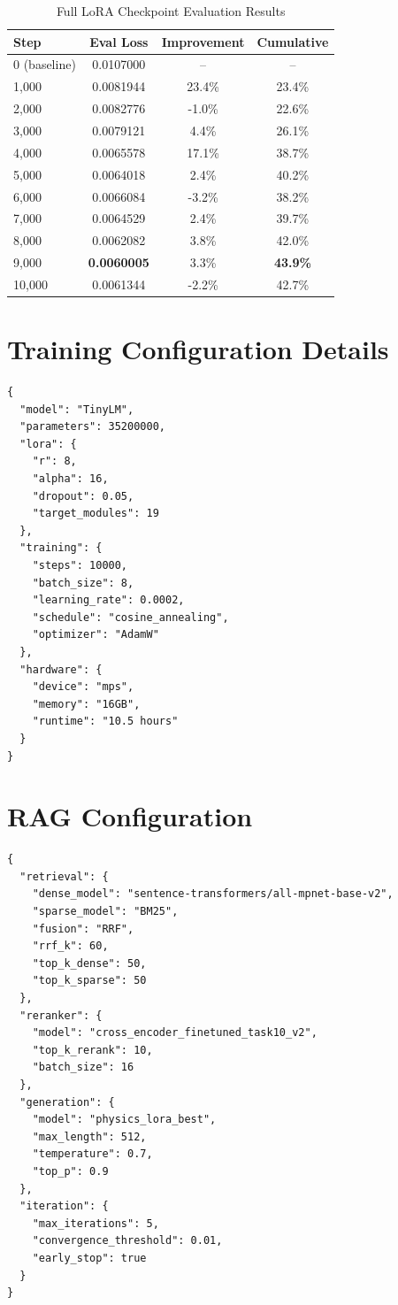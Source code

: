 \documentclass[11pt,a4paper]{article}
\theoremstyle{plain}
\theoremstyle{definition}
\begin{document}
\begin{table}[H]
\centering
\caption{Full LoRA Checkpoint Evaluation Results}
\begin{tabular}{lccc}
\toprule
\textbf{Step} & \textbf{Eval Loss} & \textbf{Improvement} & \textbf{Cumulative} \\
\midrule
0 (baseline) & 0.0107000 & -- & -- \\
1,000 & 0.0081944 & 23.4\% & 23.4\% \\
2,000 & 0.0082776 & -1.0\% & 22.6\% \\
3,000 & 0.0079121 & 4.4\% & 26.1\% \\
4,000 & 0.0065578 & 17.1\% & 38.7\% \\
5,000 & 0.0064018 & 2.4\% & 40.2\% \\
6,000 & 0.0066084 & -3.2\% & 38.2\% \\
7,000 & 0.0064529 & 2.4\% & 39.7\% \\
8,000 & 0.0062082 & 3.8\% & 42.0\% \\
9,000 & \textbf{0.0060005} & 3.3\% & \textbf{43.9\%} \\
10,000 & 0.0061344 & -2.2\% & 42.7\% \\
\bottomrule
\end{tabular}
\end{table}

\section{Training Configuration Details}
\label{app:config}

\begin{lstlisting}[caption=Complete Training Configuration]
{
  "model": "TinyLM",
  "parameters": 35200000,
  "lora": {
    "r": 8,
    "alpha": 16,
    "dropout": 0.05,
    "target_modules": 19
  },
  "training": {
    "steps": 10000,
    "batch_size": 8,
    "learning_rate": 0.0002,
    "schedule": "cosine_annealing",
    "optimizer": "AdamW"
  },
  "hardware": {
    "device": "mps",
    "memory": "16GB",
    "runtime": "10.5 hours"
  }
}
\end{lstlisting}

\section{RAG Configuration}
\label{app:rag_config}

\begin{lstlisting}[caption=RAG System Configuration]
{
  "retrieval": {
    "dense_model": "sentence-transformers/all-mpnet-base-v2",
    "sparse_model": "BM25",
    "fusion": "RRF",
    "rrf_k": 60,
    "top_k_dense": 50,
    "top_k_sparse": 50
  },
  "reranker": {
    "model": "cross_encoder_finetuned_task10_v2",
    "top_k_rerank": 10,
    "batch_size": 16
  },
  "generation": {
    "model": "physics_lora_best",
    "max_length": 512,
    "temperature": 0.7,
    "top_p": 0.9
  },
  "iteration": {
    "max_iterations": 5,
    "convergence_threshold": 0.01,
    "early_stop": true
  }
}
\end{lstlisting}
\end{document}
